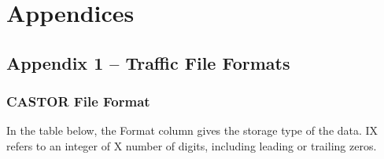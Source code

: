 \documentclass[
]{article}
\begin{document}
\section{Appendices}\label{appendices}

\subsection{Appendix 1 -- Traffic File
Formats}\label{appendix-1-traffic-file-formats}

\subsubsection*{\texorpdfstring{CASTOR File Format
}{CASTOR File Format }}\label{castor-file-format}

In the table below, the Format column gives the storage type of the
data. IX refers to an integer of X number of digits, including leading
or trailing zeros.
\end{document}
